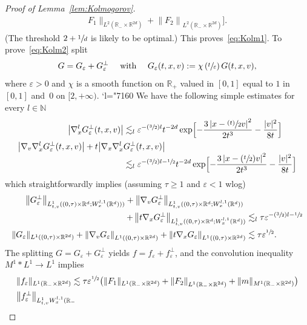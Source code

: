 \documentclass[JEP,XML,SOM,Unicode,NoFloatCountersInSection,published]{cedram}
\newcommand{\Psfrac}[2]{(\sfrac{#1}{#2})}
\newcommand{\psfrac}[2]{\sfrac{(#1)}{#2}}
\newcommand{\Changel}{\mathcode`l="7160}
\theoremstyle{definition}
\theoremstyle{remark}
\newcommand\R{{\mathbb R}}
\let\var\varepsilon
\begin{document}
\begin{proof}[Proof of Lemma~\ref{lem:Kolmogorov}]
\begin{multline*}
F_1 \|_{L^2(\R_- \times \R^{2d})} + \left\| F_2
\right\|_{L^2(\R_- \times \R^{2d})} \bigr].
\end{multline*}
(The threshold $2+\sfrac1d$ is likely to be optimal.) This
proves~\eqref{eq:Kolm1}. To prove~\eqref{eq:Kolm2} split
\begin{align*}
G = G_\var + G_\var^\bot \quad \text{ with } \quad
G_\var(t,x,v) := \chi \left( \sfrac{t}{\var} \right) G(t,x,v),
\end{align*}
where $\var >0$ and $\chi$ is a smooth function on $\R_+$
valued in $[0,1]$ equal to $1$ in $[0,1]$ and~$0$ on
$[2,+\infty)$.
\Changel
We have the following simple estimates for every
$l \in \mathbb{N}$
\begin{align*}
\left|\nabla_x^l G_\var^\bot(t,x,v)\right| &\lesssim_l
\var^{-\Psfrac32 l}t^{-2d}
\exp \Bigl[ - \frac{3 \left| x - \psfrac{t}{2} v
\right|^2}{2t^3} - \frac{|v|^2}{8t} \Bigr] \\
 \left|\nabla_v \nabla_x^l G_\var^\bot(t,x,v)\right|
+ t\bigl|\nabla_x \nabla_x^l &G_\var^\bot(t,x,v) \bigr|
\\[-3pt]
&\lesssim_l \var^{-\Psfrac32 l -\sfrac12} t^{-2d}
\exp \Bigl[ - \frac{3 \left| x - \Psfrac{t}{2} v
\right|^2}{2t^3} - \frac{|v|^2}{8t} \Bigr]
\end{align*}
which straightforwardly implies (assuming $\tau \ge 1$ and
$\var <1$ wlog)
\begin{align*}
\left\| G_\var^\bot \right\|_{L^1_{t,v}((0,\tau)
\times \R^d; W^{l,1}_x(\R^d)))} +
\left\| \nabla_v G_\var^\bot \right\|_{L^1_{t,v}((0,\tau)
\times \R^d ; W^{l,1}_x(\R^d))}\hspace*{1mm}& \\
+ \left\|t\nabla_x G_\var^\bot \right\|_{L^1_{t,v}((0,\tau)
\times \R^d ; W^{l,1}_x(\R^d))}
&\lesssim_l \tau \var^{-\Psfrac32 l -\sfrac12} \\
\| G_\var \|_{L^1((0,\tau) \times \R^{2d})} + \left\|
\nabla_v G_\var \right\|_{L^1((0,\tau) \times \R^{2d})}
+ \left\|t\nabla_x G_\var \right\|_{L^1((0,\tau) \times \R^{2d})}
&\lesssim \tau \var^{\sfrac12}.
\end{align*}
The splitting $G=G_\var + G_\var^\bot$ yields
$f = f_\var + f_\var^\bot$, and the convolution inequality
$M^1 * L^1 \to L^1$ implies
\begin{align*}
& \| f_\var \|_{L^1(\R_- \times \R^{2d})} \lesssim
\tau \var^{\sfrac12} \bigl( \| F_1 \|_{L^1(\R_- \times \R^{2d})} +
\left\| F_2 \right\|_{L^1(\R_- \times \R^{2d})}
+ \| m \|_{M^1(\R_- \times
\R^{2d})} \bigr) \\
& \bigl\| f_\var^\bot \bigr\|_{L^1_{t,v}W^{l,1}_x(\R_-
}
\end{align*}
\end{proof}
\end{document}
